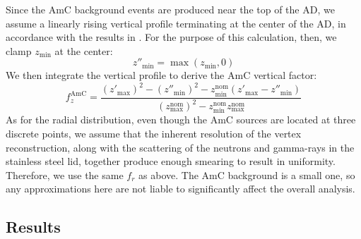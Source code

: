 \documentclass[../thesis.tex]{subfiles}
\begin{document}
Since the AmC background events are produced near the top of the AD, we assume a linearly rising vertical profile terminating at the center of the AD, in accordance with the results in \cite{Gu_2016}.
For the purpose of this calculation, then, we clamp $z_{\mathrm{min}}$ at the center:
\begin{equation}
  z''_{\mathrm{min}} = \max(z_{\mathrm{min}}, 0)
\end{equation}
We then integrate the vertical profile to derive the AmC vertical factor:
\begin{equation}
  f_z^{\mathrm{AmC}} = \frac{(z'_{\mathrm{max}})^2 - (z''_{\mathrm{min}})^2 - z_{\mathrm{min}}^{\mathrm{nom}} (z'_{\mathrm{max}} - z''_{\mathrm{min}})} {(z_{\mathrm{max}}^{\mathrm{nom}})^2 - z_{\mathrm{min}}^{\mathrm{nom}} z_{\mathrm{max}}^{\mathrm{nom}}} 
\end{equation}
As for the radial distribution, even though the AmC sources are located at three discrete points, we assume that the inherent resolution of the vertex reconstruction, along with the scattering of the neutrons and gamma-rays in the stainless steel lid, together produce enough smearing to result in uniformity. Therefore, we use the same $f_r$ as above. The AmC background is a small one, so any approximations here are not liable to significantly affect the overall analysis.

\subsection{Results}
\label{sec:cutVaryVtxCutResults}

\end{document}
